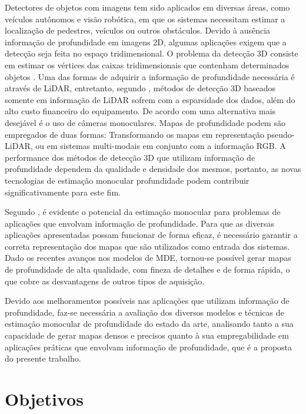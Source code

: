 Detectores de objetos com imagens tem sido aplicados em diversas áreas, como veículos autônomos e visão robótica, em que os sistemas necessitam estimar a localização de pedestres, veículos ou outros obstáculos. Devido à ausência informação de profundidade em imagens 2D, algumas aplicações exigem que a detecção seja feita no espaço tridimensional. O problema da detecção 3D consiste em estimar os vértices das caixas tridimensionais que contenham determinados objetos \cite{hu2022detection}. Uma das formas de adquirir a informação de profundidade necessária é através de LiDAR, entretanto, segundo , métodos de detecção 3D baseados somente em informação de LiDAR sofrem com a esparsidade dos dados, além do alto custo financeiro do equipamento. De acordo com  uma alternativa mais desejável é o uso de câmeras monoculares. Mapas de profundidade podem são empregados de duas formas: Transformando os mapas em representação pseudo-LiDAR, ou em sistemas multi-modais em conjunto com a informação RGB. A performance dos métodos de detecção 3D que utilizam informação de profundidade dependem da qualidade e densidade dos mesmos, portanto, as novas tecnologias de estimação monocular profundidade podem contribuir significativamente para este fim.






Segundo , é evidente o potencial da estimação monocular para problemas de aplicações que envolvam informação de profundidade. Para que as diversas aplicações apresentadas possam funcionar de forma eficaz, é necessário garantir a correta representação dos mapas que são utilizados como entrada dos sistemas. Dado os recentes avanços nos modelos de MDE, tornou-se possível gerar mapas de profundidade de alta qualidade, com fineza de detalhes e de forma rápida, o que cobre as desvantagens de outros tipos de aquisição. 

Devido aos melhoramentos possíveis nas aplicações que utilizam informação de profundidade, faz-se necessária a avaliação dos diversos modelos e técnicas de estimação monocular de profundidade do estado da arte, analisando tanto a sua capacidade de gerar mapas densos e precisos quanto à sua empregabilidade em aplicações práticas que envolvam informação de profundidade, que é a proposta do presente trabalho.

 
\section{Objetivos}


